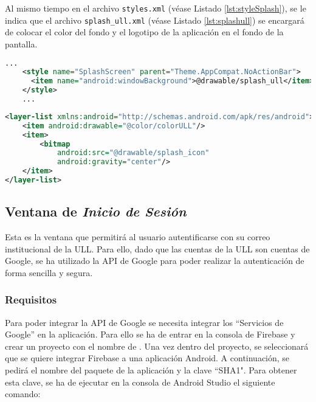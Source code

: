 Al mismo tiempo en el archivo \texttt{styles.xml} (véase Listado \ref{lst:styleSplash}), se le indica que el archivo \texttt{splash\_ull.xml} (véase Listado \ref{lst:splashull}) se encargará de colocar el color del fondo y el logotipo de la aplicación en el fondo de la pantalla. 

\begin{lstlisting}[language=XML,caption={Fichero \texttt{styles.xml}, estilo de la \textit{Splash Screen}.}, label={lst:styleSplash}]
    ...
    <style name="SplashScreen" parent="Theme.AppCompat.NoActionBar">
      <item name="android:windowBackground">@drawable/splash_ull</item>
    </style>
    ...
\end{lstlisting}

\begin{lstlisting}[language=XML,caption={Fichero  \texttt{splash\_ull.xml}, configuración del color de fondo y el logotipo de la aplicación. }, label={lst:splashull}]
<layer-list xmlns:android="http://schemas.android.com/apk/res/android">
    <item android:drawable="@color/colorULL"/>
    <item>
        <bitmap
            android:src="@drawable/splash_icon"
            android:gravity="center"/>
    </item>
</layer-list>
\end{lstlisting}

\subsection{Ventana de \textit{Inicio de Sesión} }

Esta es la ventana que permitirá al usuario autentificarse con su correo institucional de la ULL. Para ello, dado que las cuentas de la ULL son cuentas de Google, se ha utilizado la API de Google para poder realizar la autenticación de forma sencilla y segura.

\subsubsection{ Requisitos }  

Para poder integrar la API de Google se necesita integrar los ``Servicios de Google'' en la aplicación. Para ello se ha de entrar en la consola de Firebase \cite{URL::Firebase} y crear un proyecto con el nombre de \ULLAR{}. Una vez dentro del proyecto, se seleccionará que se quiere integrar Firebase a una aplicación Android. A continuación, se pedirá el nombre del paquete de la aplicación y la clave ``SHA1". Para obtener esta clave, se ha de ejecutar en la consola de Android Studio el siguiente comando: 
 
